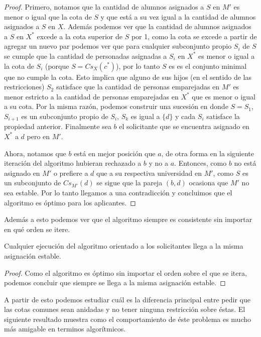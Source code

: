 \begin{proof}
Primero, notamos que la cantidad de alumnos asignados a $S$ en $M'$ es menor o igual que la cota de $S$ y que está a su vez igual a la cantidad de alumnos asignados a $S$ en $X$. Además podemos ver que la cantidad de alumnos asignados a $S$ en $X^*$ excede a la cota superior de $S$ por 1, como la cota se excede a partir de agregar un nuevo par podemos ver que para cualquier subconjunto propio $S_i$ de $S$ se cumple que la cantidad de personadas asignadas a $S_i$ en $X^*$ es menor o igual a la cota de $S_i$ (porque $S=Cs_X(c^*)$), por lo tanto $S$ es es el conjunto minimal que no cumple la cota. Esto implica que alguno de sus hijos (en el sentido de las restricciones) $S_2$ satisface que la cantidad de personas emparejadas en $M'$ es menor estricto a la cantidad de personas emparejadas en $X^*$ que es menor o igual a su cota. Por la misma razón, podemos construir una sucesión en donde $S=S_1$, $S_{i+1}$ es un subconjunto propio de $S_i$, $S_{k}$ es igual a $\{d\}$ y cada $S_i$ satisface la propiedad anterior. Finalmente sea $b$ el solicitante que se encuentra asignado en $X^*$ a $d$ pero en $M'$. 

Ahora, notamos que $b$ está en mejor posición que $a$, de otra forma en la siguiente iteración del algoritmo hubieran rechazado a $b$ y no a $a$. Entonces, como $b$ no está asignado en $M'$ o prefiere a $d$ que a su respectiva universidad en $M'$, como $S$ es un subconjunto de  $Cs_{M'}(d)$ se sigue que la pareja $(b,d)$ ocasiona que $M'$ no sea estable. Por lo tanto llegamos a una contradicción y concluimos que el algoritmo es óptimo para los aplicantes. 
\end{proof}

Además a esto podemos ver que el algoritmo siempre es consistente sin importar en qué orden se itere. 

\begin{cor}
Cualquier ejecución del algoritmo orientado a los solicitantes llega a la misma asignación estable. 
\end{cor}
\begin{proof}
Como el algoritmo es óptimo sin importar el orden sobre el que se itera, podemos concluir que siempre se llega a la misma asignación estable.
\end{proof}

A partir de esto podemos estudiar cuál es la diferencia principal entre pedir que las cotas comunes sean anidadas y no tener ninguna restricción sobre éstas. El siguiente resultado muestra como el comportamiento de éste problema es mucho más amigable en terminos algorítmicos. 

